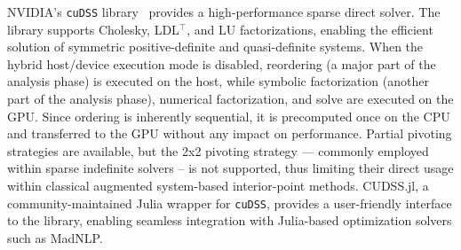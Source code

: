 NVIDIA's {\tt cuDSS} library~\cite{nvidiaNVIDIACuDSSPreview} provides a high-performance sparse direct solver.
The library supports Cholesky, LDL$^\top$, and LU factorizations, enabling the efficient solution of symmetric positive-definite and quasi-definite systems.
When the hybrid host/device execution mode is disabled, reordering (a major part of the analysis phase) is executed on the host, while symbolic factorization (another part of the analysis phase), numerical factorization, and solve are executed on the GPU.
Since ordering is inherently sequential, it is precomputed once on the CPU and transferred to the GPU without any impact on performance.
Partial pivoting strategies are available, but the 2x2 pivoting strategy --- commonly employed within sparse indefinite solvers -- is not supported, thus limiting their direct usage within classical augmented system-based interior-point methods.
CUDSS.jl, a community-maintained Julia wrapper for {\tt cuDSS}, provides a user-friendly interface to the library, enabling seamless integration with Julia-based optimization solvers such as MadNLP.


